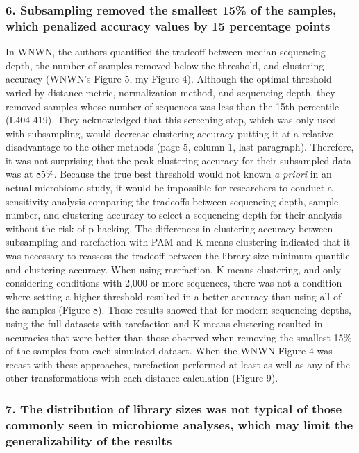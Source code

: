 \documentclass[
]{article}
\begin{document}
\hypertarget{subsampling-removed-the-smallest-15-of-the-samples-which-penalized-accuracy-values-by-15-percentage-points}{%
\subsubsection{6. Subsampling removed the smallest 15\% of the samples,
which penalized accuracy values by 15 percentage
points}\label{subsampling-removed-the-smallest-15-of-the-samples-which-penalized-accuracy-values-by-15-percentage-points}}

In WNWN, the authors quantified the tradeoff between median sequencing
depth, the number of samples removed below the threshold, and clustering
accuracy (WNWN's Figure 5, my Figure 4). Although the optimal threshold
varied by distance metric, normalization method, and sequencing depth,
they removed samples whose number of sequences was less than the 15th
percentile (L404-419). They acknowledged that this screening step, which
was only used with subsampling, would decrease clustering accuracy
putting it at a relative disadvantage to the other methods (page 5,
column 1, last paragraph). Therefore, it was not surprising that the
peak clustering accuracy for their subsampled data was at 85\%. Because
the true best threshold would not known \emph{a priori} in an actual
microbiome study, it would be impossible for researchers to conduct a
sensitivity analysis comparing the tradeoffs between sequencing depth,
sample number, and clustering accuracy to select a sequencing depth for
their analysis without the risk of p-hacking. The differences in
clustering accuracy between subsampling and rarefaction with PAM and
K-means clustering indicated that it was necessary to reassess the
tradeoff between the library size minimum quantile and clustering
accuracy. When using rarefaction, K-means clustering, and only
considering conditions with 2,000 or more sequences, there was not a
condition where setting a higher threshold resulted in a better accuracy
than using all of the samples (Figure 8). These results showed that for
modern sequencing depths, using the full datasets with rarefaction and
K-means clustering resulted in accuracies that were better than those
observed when removing the smallest 15\% of the samples from each
simulated dataset. When the WNWN Figure 4 was recast with these
approaches, rarefaction performed at least as well as any of the other
transformations with each distance calculation (Figure 9).

\hypertarget{the-distribution-of-library-sizes-was-not-typical-of-those-commonly-seen-in-microbiome-analyses-which-may-limit-the-generalizability-of-the-results}{%
\subsubsection{7. The distribution of library sizes was not typical of
those commonly seen in microbiome analyses, which may limit the
generalizability of the
results}\label{the-distribution-of-library-sizes-was-not-typical-of-those-commonly-seen-in-microbiome-analyses-which-may-limit-the-generalizability-of-the-results}}
\end{document}
